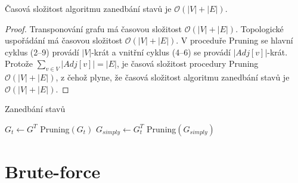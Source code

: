         \begin{theorem}
            Časová složitost algoritmu zanedbání stavů je $\mathcal{O}(|V| + |E|)$.
        \end{theorem}

        \begin{proof}
            Transponování grafu má časovou složitost $\mathcal{O}(|V| + |E|)$. Topologické uspořádání má časovou složitost $\mathcal{O}(|V| + |E|)$. V proceduře Pruning se hlavní cyklus (2--9) provádí $|V|$-krát a vnitřní cyklus (4--6) se provádí $|Adj[v]|$-krát. Protože $\sum_{v \in V}|Adj[v]| = |E|$, je časová složitost procedury Pruning $\mathcal{O}(|V| + |E|)$, z čehož plyne, že časová složitost algoritmu zanedbání stavů je $\mathcal{O}(|V| + |E|)$.
        \end{proof}

        \newpage

        \begin{algorithm}
            \label{algo:ZanedbaniStavu}
            \DontPrintSemicolon
            \caption{Zanedbání stavů}
            \vspace*{0.5em}

            \vspace*{0.5em}

            $G_t \leftarrow G^T$ 
            Pruning$(G_t)$ 
            $G_{simply} \leftarrow G_t^T$ 
            Pruning$(G_{simply})$ 
            \vspace*{0.5em}


        \end{algorithm}

\chapter{Brute-force}
    \label{chapter:Algo1}
    \lipsum[1]

